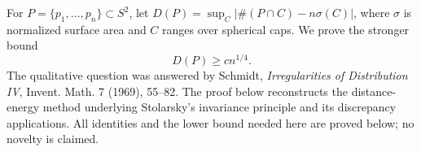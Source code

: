 For $P=\{p_1,\ldots,p_n\}\subset S^2$, let
$D(P)=\sup_C|\#(P\cap C)-n\sigma(C)|$, where $\sigma$ is normalized surface area and $C$ ranges over spherical caps. We prove the stronger bound
\[
 D(P)\ge c n^{1/4}.
\]
The qualitative question was answered by Schmidt, \emph{Irregularities of Distribution IV}, Invent. Math. 7 (1969), 55--82. The proof below reconstructs the distance-energy method underlying Stolarsky's invariance principle and its discrepancy applications. All identities and the lower bound needed here are proved below; no novelty is claimed.
